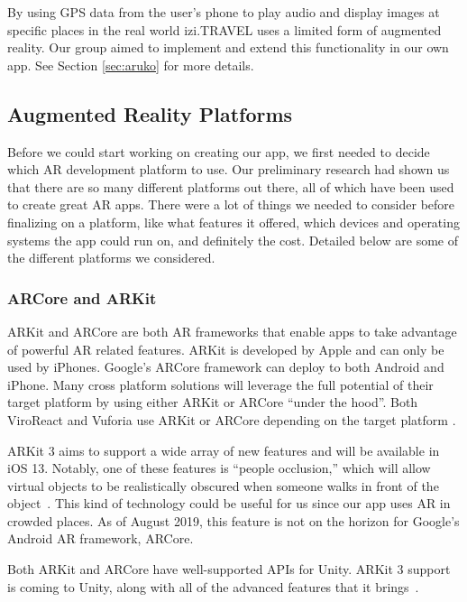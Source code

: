 \documentclass[a4paper, 10pt, american, titlepage]{article}
\begin{document}
By using GPS data from the user's phone to play audio and display images at
specific places in the real world izi.TRAVEL uses a limited form of augmented
reality. Our group aimed to implement and extend this functionality in our own
app. See Section \ref{sec:aruko} for more details.

\subsection{Augmented Reality Platforms}
\label{sec:platforms}

Before we could start working on creating our app, we first needed to decide
which AR development platform to use. Our preliminary research had shown us that
there are so many different platforms out there, all of which have been used to
create great AR apps. There were a lot of things we needed to consider before
finalizing on a platform, like what features it offered, which devices and
operating systems the app could run on, and definitely the cost. Detailed below
are some of the different platforms we considered.

\subsubsection{ARCore and ARKit}
\label{sec:ARCoreAndARKit}

ARKit and ARCore are both AR frameworks that enable apps to take advantage of
powerful AR related features. ARKit is developed by Apple and can only be used
by iPhones. Google's ARCore framework can deploy to both Android and iPhone.
Many cross platform solutions will leverage the full potential of their target
platform by using either ARKit or ARCore ``under the hood''. Both ViroReact and
Vuforia use ARKit or ARCore depending on the target platform
\autocites{vuforiaFusion}{moon2018}.

ARKit 3 aims to support a wide array of new features and will be available in
iOS 13. Notably, one of these features is ``people occlusion,'' which will allow
virtual objects to be realistically obscured when someone walks in front of the
object~\autocite{apple2019}. This kind of technology could be useful for us
since our app uses AR in crowded places.  As of August 2019, this feature is
not on the horizon for Google's Android AR framework, ARCore.

Both ARKit and ARCore have well-supported APIs for Unity. ARKit 3 support is
coming to Unity, along with all of the advanced features that it
brings~\autocite{stinson2019}.
\end{document}
